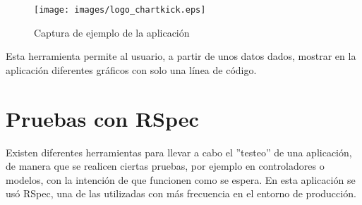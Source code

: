 \begin{figure}[!th]
\begin{center}
\texttt{[image: images/logo\_chartkick.eps]}
\caption{Captura de ejemplo de la aplicación}
\label{fig:8}
\end{center}
\end{figure}

Esta herramienta permite al usuario, a partir de unos datos dados, mostrar en la aplicación diferentes gráficos con solo una línea de código.


\section{Pruebas con RSpec}
\label{3:sec:6}

Existen diferentes herramientas para llevar a cabo el ''testeo'' de una aplicación, de manera que se realicen ciertas pruebas, por ejemplo en controladores o modelos, con la intención de que funcionen como se espera. En esta aplicación se usó RSpec\cite{RSpec}, una de las utilizadas con más frecuencia en el entorno de producción.
